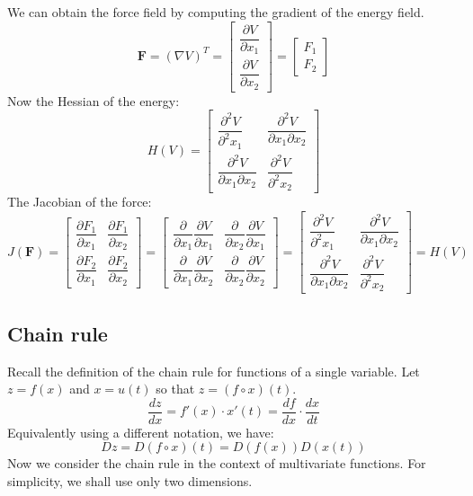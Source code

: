 \documentclass{article}
\begin{document}
We can obtain the force field by computing the gradient of the energy field.
\[
    \mathbf{F} = (\nabla V)^T =
    \begin{bmatrix}
        \dfrac{\partial V}{\partial x_1} \\ 
        \dfrac{\partial V}{\partial x_2}
    \end{bmatrix} = 
    \begin{bmatrix} F_1 \\ F_2 \end{bmatrix}
\]
Now the Hessian of the energy:
\[
    H(V) =
    \begin{bmatrix}
        \dfrac{\partial^2 V}{\partial^2 x_1} &
        \dfrac{\partial^2 V}{\partial x_1 \partial x_2}  \\
        \dfrac{\partial^2 V}{\partial x_1 \partial x_2} &
        \dfrac{\partial^2 V}{\partial^2 x_2}
    \end{bmatrix}
\]
The Jacobian of the force:
\[
    J(\mathbf{F}) =
    \begin{bmatrix}
        \dfrac{\partial F_1}{\partial x_1} & \dfrac{\partial F_1}{\partial x_2} \\ 
        \dfrac{\partial F_2}{\partial x_1} & \dfrac{\partial F_2}{\partial x_2}
    \end{bmatrix} = 
    \begin{bmatrix}
        \dfrac{\partial}{\partial x_1} \dfrac{\partial V}{\partial x_1} &
        \dfrac{\partial}{\partial x_2} \dfrac{\partial V}{\partial x_1} \\ 
        \dfrac{\partial}{\partial x_1} \dfrac{\partial V}{\partial x_2} &
        \dfrac{\partial}{\partial x_2} \dfrac{\partial V}{\partial x_2}
    \end{bmatrix} = 
    \begin{bmatrix}
        \dfrac{\partial^2 V}{\partial^2 x_1} & \dfrac{\partial^2 V}{\partial x_1 \partial x_2}  \\ 
        \dfrac{\partial^2 V}{\partial x_1 \partial x_2} & \dfrac{\partial^2 V}{\partial^2 x_2}
    \end{bmatrix} = H(V)
\]
\subsection{Chain rule}
Recall the definition of the chain rule for functions of a single variable. Let $z=f(x)$ and $x=u(t)$ so that $z = (f \circ x)(t)$.
\[
\frac{dz}{dx} = f'(x) \cdot x'(t) = \frac{df}{dx} \cdot \frac{dx}{dt}
\]
Equivalently using a different notation, we have:
\[
    Dz = D(f \circ x)(t) = D(f(x))D(x(t))
\]
Now we consider the chain rule in the
context of multivariate functions. For simplicity, we shall use only two
dimensions.
\end{document}
